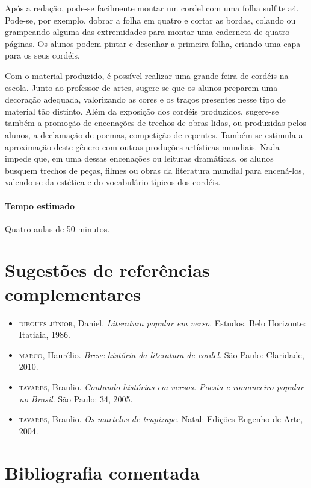 \documentclass[11pt]{extarticle}
\begin{document}
Após a redação, pode-se facilmente montar um cordel com uma folha sulfite a4. 
Pode-se, por exemplo, dobrar a folha em quatro e cortar as bordas, colando ou grampeando alguma das extremidades para montar uma caderneta de quatro páginas.
Os alunos podem pintar e desenhar a primeira folha, criando uma capa para os seus cordéis.

Com o material produzido, é possível realizar uma grande
feira de cordéis na escola. Junto ao professor de artes, sugere-se que
os alunos preparem uma decoração adequada, valorizando as cores e os
traços presentes nesse tipo de material tão distinto. Além da exposição
dos cordéis produzidos, sugere-se também a promoção de encenações de
trechos de obras lidas, ou produzidas pelos alunos, a declamação de
poemas, competição de repentes. Também se estimula a aproximação deste
gênero com outras produções artísticas mundiais. Nada impede que, em uma
dessas encenações ou leituras dramáticas, os alunos busquem trechos
de peças, filmes ou obras da literatura mundial para encená-los, valendo-se
da estética e do vocabulário típicos dos cordéis.

\paragraph{Tempo estimado} Quatro aulas de 50 minutos.


\section{Sugestões de referências complementares}


\begin{itemize}
\item \textsc{diegues júnior}, Daniel. \textit{Literatura popular em verso}. Estudos. Belo Horizonte: Itatiaia, 1986. 

\item \textsc{marco}, Haurélio. \textit{Breve história da literatura de cordel}. São Paulo: Claridade, 2010.

\item \textsc{tavares}, Braulio. \textit{Contando histórias em versos. Poesia e romanceiro popular no Brasil}. São Paulo: 34, 2005.

\item \textsc{tavares}, Braulio. \textit{Os martelos de trupizupe}. Natal: Edições Engenho de Arte, 2004.
\end{itemize}

\section{Bibliografia comentada}
\end{document}
